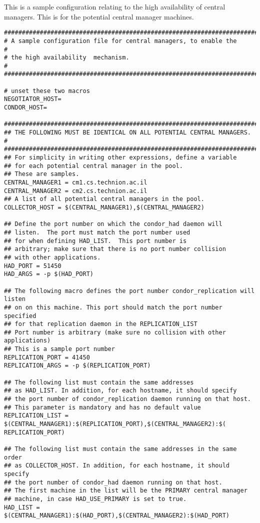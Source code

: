 This is a sample configuration relating to the 
high availability of central managers.
This is for the potential central manager machines.

\footnotesize
\begin{verbatim}
##########################################################################
# A sample configuration file for central managers, to enable the        #
# the high availability  mechanism.                                      #
##########################################################################

# unset these two macros 
NEGOTIATOR_HOST=
CONDOR_HOST=

#########################################################################
## THE FOLLOWING MUST BE IDENTICAL ON ALL POTENTIAL CENTRAL MANAGERS.   # 
#########################################################################
## For simplicity in writing other expressions, define a variable
## for each potential central manager in the pool. 
## These are samples.
CENTRAL_MANAGER1 = cm1.cs.technion.ac.il
CENTRAL_MANAGER2 = cm2.cs.technion.ac.il
## A list of all potential central managers in the pool.
COLLECTOR_HOST = $(CENTRAL_MANAGER1),$(CENTRAL_MANAGER2)

## Define the port number on which the condor_had daemon will
## listen.  The port must match the port number used
## for when defining HAD_LIST.  This port number is
## arbitrary; make sure that there is no port number collision
## with other applications.
HAD_PORT = 51450
HAD_ARGS = -p $(HAD_PORT)

## The following macro defines the port number condor_replication will listen
## on on this machine. This port should match the port number specified
## for that replication daemon in the REPLICATION_LIST
## Port number is arbitrary (make sure no collision with other applications)
## This is a sample port number
REPLICATION_PORT = 41450
REPLICATION_ARGS = -p $(REPLICATION_PORT)

## The following list must contain the same addresses
## as HAD_LIST. In addition, for each hostname, it should specify 
## the port number of condor_replication daemon running on that host.
## This parameter is mandatory and has no default value
REPLICATION_LIST = $(CENTRAL_MANAGER1):$(REPLICATION_PORT),$(CENTRAL_MANAGER2):$( REPLICATION_PORT)

## The following list must contain the same addresses in the same order 
## as COLLECTOR_HOST. In addition, for each hostname, it should specify 
## the port number of condor_had daemon running on that host.
## The first machine in the list will be the PRIMARY central manager
## machine, in case HAD_USE_PRIMARY is set to true.
HAD_LIST = $(CENTRAL_MANAGER1):$(HAD_PORT),$(CENTRAL_MANAGER2):$(HAD_PORT)



\end{verbatim}
